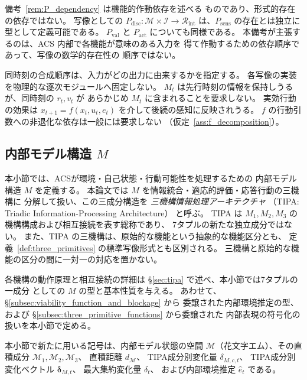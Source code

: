 \begin{remark}[作動依存と形式的存在の区別]
\label{rem:functional_vs_existential}
備考~\ref{rem:P_dependency} は機能的作動依存を述べる
ものであり、形式的存在の依存ではない。
写像としての $P_{\mathrm{disc}} : \mathcal M\times\mathcal{I}\to\mathcal{R}_{\mathrm{int}}$
は、$P_{\mathrm{sens}}$ の存在とは独立に型として定義可能である。
$P_{\mathrm{val}}$ と $P_{\mathrm{act}}$ についても同様である。
本備考が主張するのは、ACS 内部で各機能が意味のある入力を
得て作動するための依存順序であって、写像の数学的存在性の
順序ではない。
\end{remark}

\begin{remark}[情報依存と物理的時間順序の区別]
\label{rem:primitive_no_temporal_order}
同時刻の合成順序は、入力がどの出力に由来するかを指定する。
各写像の実装を物理的な逐次モジュールへ固定しない。
$M_t$ は先行時刻の情報を保持しうるが、同時刻の $r_t,v_t$ が
あらかじめ $M_t$ に含まれることを要求しない。
実効行動の効果は $x_{t+1}=f(x_t,u_t,e_t)$ を介して後続の感知に反映されうる。
$f$ の行動引数への非退化な依存は一般には要求しない
（仮定~\ref{ass:f_decomposition}）。
\end{remark}

\subsection{内部モデル構造 $M$}
\label{subsec:internal_model_M}

本小節では、ACSが環境・自己状態・行動可能性を処理するための
内部モデル構造 $M$ を定義する。
本論文では $M$ を情報統合・適応的評価・応答行動の三機構に
分解して扱い、この三成分構造を
\emph{三機構情報処理アーキテクチャ}
（TIPA: Triadic Information-Processing Architecture）
と呼ぶ。
TIPA は $M_1,M_2,M_3$ の機構構成および相互接続を表す総称であり、
7タプルの新たな独立成分ではない。
また、TIPA の三機構は、原始的な機能という抽象的な機能区分とも、
定義~\ref{def:three_primitives} の標準写像形式とも区別される。
三機構と原始的な機能の区分の間に一対一の対応を置かない。

各機構の動作原理と相互接続の詳細は
\S\ref{sec:tipa} で述べ、本小節では7タプルの一成分
としての $M$ の型と基本性質を与える。
あわせて、\S\ref{subsec:viability_function_and_blockage} から
委譲された内部環境推定の型、および
\S\ref{subsec:three_primitive_functions} から委譲された
内部表現の符号化の扱いを本小節で定める。

本小節で新たに用いる記号は、内部モデル状態の空間
$\mathcal{M}$（花文字エム）、その直積成分
$\mathcal{M}_1,\mathcal{M}_2,\mathcal{M}_3$、
直積距離 $d_{\mathcal{M}}$、
TIPA成分別変化量 $\delta_{M,c,t}$、
TIPA成分別変化ベクトル
$\boldsymbol{\delta}_{M,t}$、
最大集約変化量 $\delta_t$、
および内部環境推定 $\hat{e}_t$ である。

